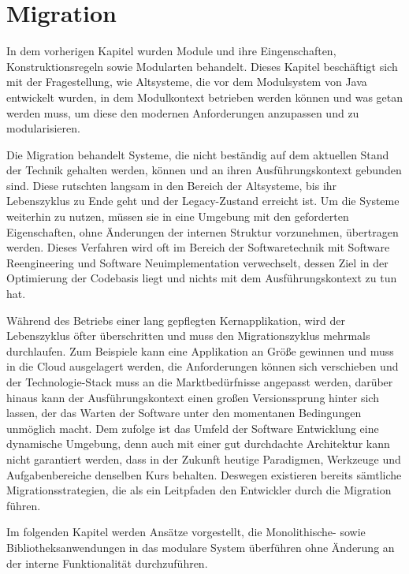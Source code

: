 \chapter{Migration}

	In dem vorherigen Kapitel wurden Module und ihre Eingenschaften, Konstruktionsregeln sowie Modularten behandelt. Dieses Kapitel beschäftigt sich mit der Fragestellung, wie Altsysteme, die vor dem Modulsystem von Java entwickelt wurden, in dem Modulkontext betrieben werden können und was getan werden muss, um diese den modernen Anforderungen anzupassen und zu modularisieren.\bigbreak

	Die Migration behandelt Systeme, die nicht beständig auf dem aktuellen Stand der Technik gehalten werden, können und an ihren Ausführungskontext gebunden sind. Diese rutschten langsam in den Bereich der Altsysteme, bis ihr Lebenszyklus zu Ende geht und der Legacy-Zustand erreicht ist. Um die Systeme weiterhin zu nutzen, müssen sie in eine Umgebung mit den geforderten Eigenschaften, ohne Änderungen der internen Struktur vorzunehmen, übertragen werden. Dieses Verfahren wird oft im Bereich der Softwaretechnik mit Software Reengineering und Software Neuimplementation verwechselt, dessen Ziel in der Optimierung der Codebasis liegt und nichts mit dem Ausführungskontext zu tun hat. \cite{martens2016ablosung} \bigbreak

	Während des Betriebs einer lang gepflegten Kernapplikation, wird der Lebenszyklus öfter überschritten und muss den Migrationszyklus mehrmals durchlaufen. Zum Beispiele kann eine Applikation an Größe gewinnen und muss in die Cloud ausgelagert werden, die Anforderungen können sich verschieben und der Technologie-Stack muss an die Marktbedürfnisse angepasst werden, darüber hinaus kann der Ausführungskontext einen großen Versionssprung hinter sich lassen, der das Warten der Software unter den momentanen Bedingungen unmöglich macht. \newline
	Dem zufolge ist das Umfeld der Software Entwicklung eine dynamische Umgebung, denn auch mit einer gut durchdachte Architektur kann nicht garantiert werden, dass in der Zukunft heutige Paradigmen, Werkzeuge und Aufgabenbereiche denselben Kurs behalten. Deswegen existieren bereits sämtliche Migrationsstrategien, die als ein Leitpfaden den Entwickler durch die Migration führen. \bigbreak

	Im folgenden Kapitel werden Ansätze vorgestellt, die Monolithische- sowie Bibliotheksanwendungen in das modulare System überführen ohne Änderung an der interne Funktionalität durchzuführen. 


